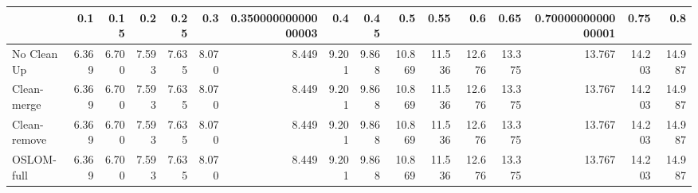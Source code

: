 \begin{tabular}{lrrrrrrrrrrrrrrr}
\toprule
{} &   0.1 &  0.15 &   0.2 &  0.25 &   0.3 & 0.35000000000000003 &   0.4 &  0.45 &    0.5 &   0.55 &    0.6 &   0.65 & 0.7000000000000001 &   0.75 &    0.8 \\
\midrule
No Clean Up  & 6.369 & 6.700 & 7.593 & 7.635 & 8.070 &               8.449 & 9.201 & 9.868 & 10.869 & 11.536 & 12.676 & 13.375 &             13.767 & 14.203 & 14.987 \\
Clean-merge  & 6.369 & 6.700 & 7.593 & 7.635 & 8.070 &               8.449 & 9.201 & 9.868 & 10.869 & 11.536 & 12.676 & 13.375 &             13.767 & 14.203 & 14.987 \\
Clean-remove & 6.369 & 6.700 & 7.593 & 7.635 & 8.070 &               8.449 & 9.201 & 9.868 & 10.869 & 11.536 & 12.676 & 13.375 &             13.767 & 14.203 & 14.987 \\
OSLOM-full   & 6.369 & 6.700 & 7.593 & 7.635 & 8.070 &               8.449 & 9.201 & 9.868 & 10.869 & 11.536 & 12.676 & 13.375 &             13.767 & 14.203 & 14.987 \\
\bottomrule
\end{tabular}
